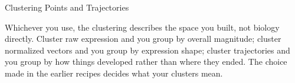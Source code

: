 \begin{recipe}[label=sub:clustering]{Clustering Points and Trajectories}
\begin{interpretation}
  Whichever you use, the clustering describes the space you built, not biology
  directly. Cluster raw expression and you group by overall magnitude; cluster
  normalized vectors and you group by expression shape; cluster trajectories
  and you group by how things developed rather than where they ended. The
  choice made in the earlier recipes decides what your clusters mean.
\end{interpretation}

\begin{references}
\end{references}

\end{recipe}
